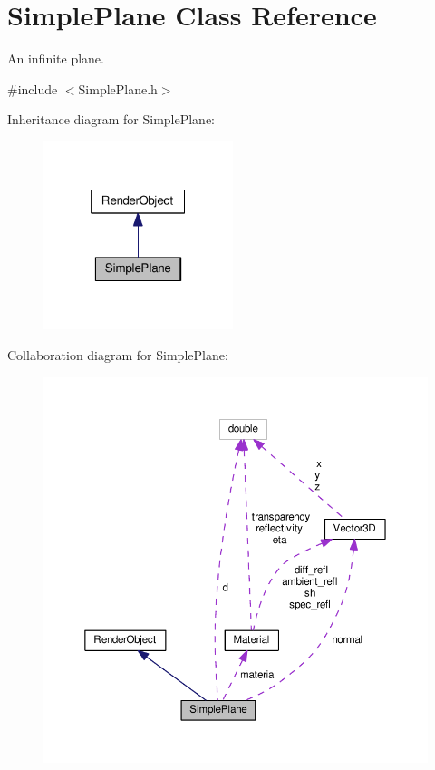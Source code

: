 \hypertarget{classSimplePlane}{}\section{Simple\+Plane Class Reference}
\label{classSimplePlane}


An infinite plane.  




{\ttfamily \#include $<$Simple\+Plane.\+h$>$}



Inheritance diagram for Simple\+Plane\+:\nopagebreak
\begin{figure}[H]
\begin{center}
\leavevmode
\includegraphics[width=157pt]{classSimplePlane__inherit__graph}
\end{center}
\end{figure}


Collaboration diagram for Simple\+Plane\+:\nopagebreak
\begin{figure}[H]
\begin{center}
\leavevmode
\includegraphics[width=350pt]{classSimplePlane__coll__graph}
\end{center}
\end{figure}

